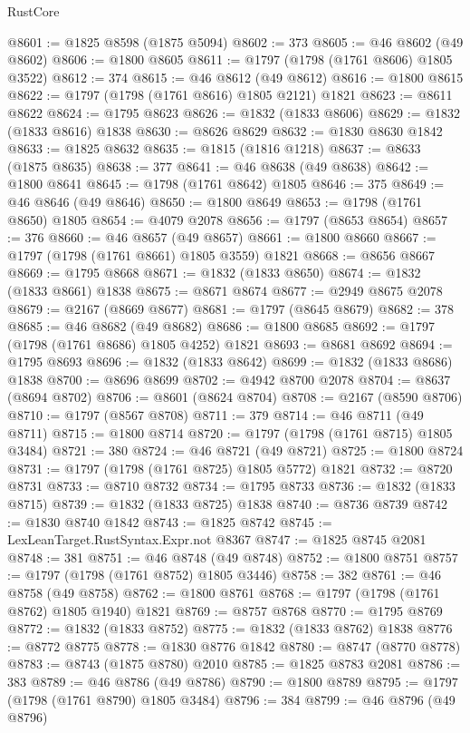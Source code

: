 \begin{lexlean}{RustCore}
\begin{coremodule}
@8601 := @1825 @8598 (@1875 @5094)
@8602 := 373
@8605 := @46 @8602 (@49 @8602)
@8606 := @1800 @8605
@8611 := @1797 (@1798 (@1761 @8606) @1805 @3522)
@8612 := 374
@8615 := @46 @8612 (@49 @8612)
@8616 := @1800 @8615
@8622 := @1797 (@1798 (@1761 @8616) @1805 @2121) @1821
@8623 := @8611 @8622
@8624 := @1795 @8623
@8626 := @1832 (@1833 @8606)
@8629 := @1832 (@1833 @8616) @1838
@8630 := @8626 @8629
@8632 := @1830 @8630 @1842
@8633 := @1825 @8632
@8635 := @1815 (@1816 @1218)
@8637 := @8633 (@1875 @8635)
@8638 := 377
@8641 := @46 @8638 (@49 @8638)
@8642 := @1800 @8641
@8645 := @1798 (@1761 @8642) @1805
@8646 := 375
@8649 := @46 @8646 (@49 @8646)
@8650 := @1800 @8649
@8653 := @1798 (@1761 @8650) @1805
@8654 := @4079 @2078
@8656 := @1797 (@8653 @8654)
@8657 := 376
@8660 := @46 @8657 (@49 @8657)
@8661 := @1800 @8660
@8667 := @1797 (@1798 (@1761 @8661) @1805 @3559) @1821
@8668 := @8656 @8667
@8669 := @1795 @8668
@8671 := @1832 (@1833 @8650)
@8674 := @1832 (@1833 @8661) @1838
@8675 := @8671 @8674
@8677 := @2949 @8675 @2078
@8679 := @2167 (@8669 @8677)
@8681 := @1797 (@8645 @8679)
@8682 := 378
@8685 := @46 @8682 (@49 @8682)
@8686 := @1800 @8685
@8692 := @1797 (@1798 (@1761 @8686) @1805 @4252) @1821
@8693 := @8681 @8692
@8694 := @1795 @8693
@8696 := @1832 (@1833 @8642)
@8699 := @1832 (@1833 @8686) @1838
@8700 := @8696 @8699
@8702 := @4942 @8700 @2078
@8704 := @8637 (@8694 @8702)
@8706 := @8601 (@8624 @8704)
@8708 := @2167 (@8590 @8706)
@8710 := @1797 (@8567 @8708)
@8711 := 379
@8714 := @46 @8711 (@49 @8711)
@8715 := @1800 @8714
@8720 := @1797 (@1798 (@1761 @8715) @1805 @3484)
@8721 := 380
@8724 := @46 @8721 (@49 @8721)
@8725 := @1800 @8724
@8731 := @1797 (@1798 (@1761 @8725) @1805 @5772) @1821
@8732 := @8720 @8731
@8733 := @8710 @8732
@8734 := @1795 @8733
@8736 := @1832 (@1833 @8715)
@8739 := @1832 (@1833 @8725) @1838
@8740 := @8736 @8739
@8742 := @1830 @8740 @1842
@8743 := @1825 @8742
@8745 := LexLeanTarget.RustSyntax.Expr.not @8367
@8747 := @1825 @8745 @2081
@8748 := 381
@8751 := @46 @8748 (@49 @8748)
@8752 := @1800 @8751
@8757 := @1797 (@1798 (@1761 @8752) @1805 @3446)
@8758 := 382
@8761 := @46 @8758 (@49 @8758)
@8762 := @1800 @8761
@8768 := @1797 (@1798 (@1761 @8762) @1805 @1940) @1821
@8769 := @8757 @8768
@8770 := @1795 @8769
@8772 := @1832 (@1833 @8752)
@8775 := @1832 (@1833 @8762) @1838
@8776 := @8772 @8775
@8778 := @1830 @8776 @1842
@8780 := @8747 (@8770 @8778)
@8783 := @8743 (@1875 @8780) @2010
@8785 := @1825 @8783 @2081
@8786 := 383
@8789 := @46 @8786 (@49 @8786)
@8790 := @1800 @8789
@8795 := @1797 (@1798 (@1761 @8790) @1805 @3484)
@8796 := 384
@8799 := @46 @8796 (@49 @8796)

\end{coremodule}
\end{lexlean}

